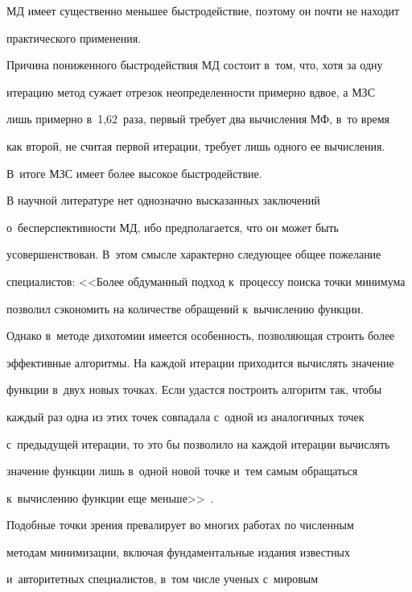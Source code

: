 МД имеет существенно меньшее быстродействие, поэтому он почти не находит 


практического применения. 


  


  Причина пониженного быстродействия МД состоит в~том, что, хотя за одну 


итерацию метод сужает отрезок неопределенности примерно вдвое, а МЗС 


лишь примерно в~1,62~раза, первый требует два вычисления МФ, в~то время 


как второй, не считая первой итерации, требует лишь одного ее вычисления. 


В~итоге МЗС имеет более высокое быстродействие.


  


  В научной литературе нет однозначно высказанных заключений 


о~бесперспективности МД, ибо предполагается, что он может быть 


усовершенствован. В~этом смысле характерно следующее общее пожелание 


специалистов: <<Более обдуманный подход к~процессу поиска точки минимума 


позволил сэкономить на количестве обращений к~вычислению функции. 


Однако в~методе дихотомии имеется особенность, позволяющая строить более 


эффективные алгоритмы. На каждой итерации приходится вычислять значение 


функции в~двух новых  точках. Если удастся построить алгоритм так, чтобы 


каждый раз одна из этих точек совпадала с~одной из аналогичных точек 


с~предыдущей итерации, то это бы позволило на каждой итерации вычислять 


значение функции лишь в~одной новой точке и~тем самым обращаться 


к~вычислению функции еще меньше>>~\cite{7-kod}.  


  


  Подобные точки зрения превалирует во многих работах по численным 


методам минимизации, включая фундаментальные издания известных 


и~авторитетных специалистов, в~том числе ученых с~мировым  


